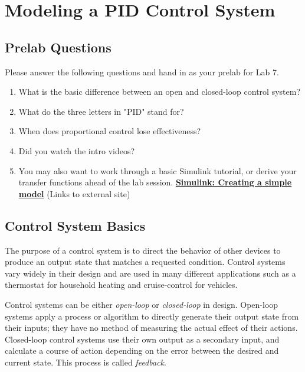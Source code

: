 \documentclass[openany,11pt,fleqn]{book} %
\begin{document}
	
\chapter{Modeling a PID Control System}

\section{\color{blue}Prelab Questions}
\begin{question}[Prelab 7]
	Please answer the following questions and hand in as your prelab for Lab 7.
	\begin{enumerate}
		\item What is the basic difference between an open and closed-loop control system?
		\item What do the three letters in "PID" stand for? 
		\item When does proportional control lose effectiveness?
		\item Did you watch the intro videos?
		\item You may also want to work through a basic Simulink tutorial, or derive your transfer functions ahead of the lab session. 
		\href{http://www.mathworks.com/help/simulink/gs/create-a-simple-model.html}{\textbf{Simulink: Creating a simple model}}	(Links to external site)	
	\end{enumerate}
\end{question}

\section{Control System Basics}
The purpose of a control system is to direct the behavior of other devices to produce an output state that matches a requested condition. Control systems vary widely in their design and are used in many different applications such as a thermostat for household heating and cruise-control for vehicles.

Control systems can be either \textit{open-loop} or \textit{closed-loop} in design. Open-loop systems apply a process or algorithm to directly generate their output state from their inputs; they have no method of measuring the actual effect of their actions. Closed-loop control systems use their own output as a secondary input, and calculate a course of action depending on the error between the desired and current state. This process is called \textit{feedback}.
\end{document}

